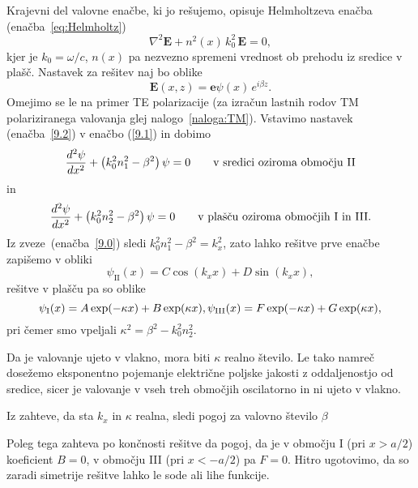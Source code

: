 Krajevni del valovne enačbe, ki jo rešujemo, opisuje Helmholtzeva enačba 
(enačba~\ref{eq:Helmholtz})
\begin{equation}
\nabla^{2}\mathbf{E}+n^2(x)\,k_{0}^{2}\,\mathbf{E}=0,
\label{9.1}
\end{equation}
kjer je $k_{0}=\omega/c$, $n(x)$ pa nezvezno spremeni vrednost ob prehodu iz sredice v plašč. 
Nastavek za rešitev naj bo oblike 
\begin{equation}
{\mathbf E}(x,z)=\mathbf{e}\psi\left(x\right)\, e^{i\beta z}.
\label{9.2}
\end{equation}
Omejimo se le na primer TE polarizacije (za izračun lastnih rodov 
TM polariziranega
valovanja glej nalogo~\ref{naloga:TM}). Vstavimo nastavek (enačba~\ref{9.2}) v enačbo
(\ref{9.1}) in dobimo
\begin{equation}
\frac{d^{2}{\bf \psi}}{dx^{2}}+\left(k_{0}^{2}n_1^{2}-\beta^{2}\right){\bf \psi}=0
\qquad \textrm{v sredici oziroma obmo\v cju II} 
\label{9.3a}
\end{equation}
in 
\begin{equation}
\frac{d^{2}{\bf \psi}}{dx^{2}}+\left(k_{0}^{2}n_2^{2}-\beta^{2}\right){\bf \psi}=0
\qquad \textrm{v plašču oziroma obmo\v cjih I in III.} 
\label{9.3b}
\end{equation}
Iz zveze~(enačba~\ref{9.0}) sledi $k_0^2n_1^2-\beta^2=k_x^2$, zato lahko rešitve prve enačbe
zapišemo v obliki
\begin{equation}
\psi_{\mathrm{II}}(x) = C \cos(k_x x)+D \sin(k_x x),
\end{equation}
rešitve v plašču pa so oblike
\begin{equation}
\psi_{\mathrm{I}}(x) = A \exp(-\kappa x)+B \exp(\kappa x),\\
\psi_{\mathrm{III}}(x) = F \exp(-\kappa x)+G \exp(\kappa x),
\end{equation}
pri čemer smo vpeljali $\kappa^2= \beta^2-k_0^2n_2^2$.

Da je valovanje ujeto v vlakno, mora biti $\kappa$ realno število.
Le tako namreč dosežemo eksponentno pojemanje električne poljske jakosti 
z oddaljenostjo od sredice,
sicer je valovanje v vseh treh območjih oscilatorno in ni ujeto v vlakno. 

Iz zahteve, da sta $k_x$ in $\kappa$ realna, sledi pogoj za valovno 
število $\beta$

Poleg tega zahteva po končnosti rešitve da pogoj, da je v območju I (pri $x>a/2$) koeficient $B=0$, 
v območju III (pri $x<-a/2$) pa $F=0$. Hitro ugotovimo, da so zaradi simetrije rešitve
lahko le sode ali lihe funkcije. 

